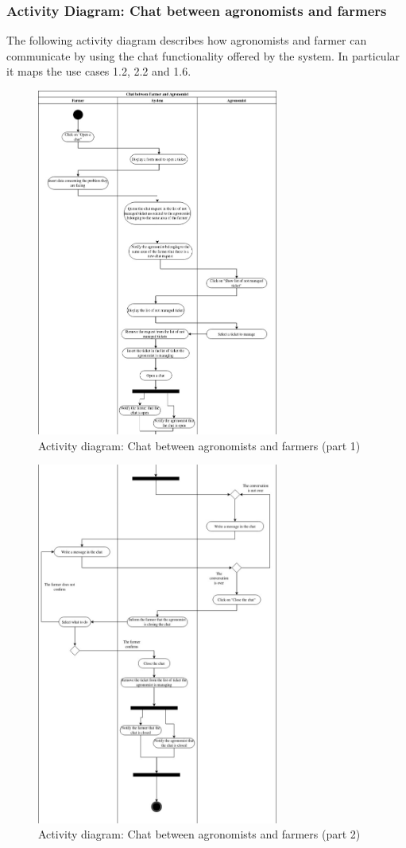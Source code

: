 \documentclass[10pt]{report}
\begin{document}
\subsubsection{Activity Diagram: Chat between agronomists and farmers}
The following activity diagram describes how agronomists and farmer can communicate by using the chat functionality offered by the system. In particular it maps the use cases 1.2, 2.2 and 1.6.
\begin{figure}[H]
    \centering
    \includegraphics[width=300px]{ActivityDiagrams/Chat_1.png}
    \caption{Activity diagram: Chat between agronomists and farmers (part 1)}
\end{figure}
\begin{figure}[H]
    \centering
    \includegraphics[width=300px]{ActivityDiagrams/Chat_2.png}
    \caption{Activity diagram: Chat between agronomists and farmers (part 2)}
\end{figure}
\end{document}
